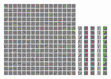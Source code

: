 \begin{figure}[t]
    \centering
        \newcommand{\codeheight}{0.25}
        \includegraphics[height=\codeheight\linewidth]{figs/sizematters/centroids/dictionary_ap.png}\qquad\qquad
        \includegraphics[height=\codeheight\textwidth]{figs/sizematters/centroids/1-neighbors.png}
        \includegraphics[height=\codeheight\textwidth]{figs/sizematters/centroids/2-neighbors.png}
        \includegraphics[height=\codeheight\textwidth]{figs/sizematters/centroids/6-neighbors.png}
        \includegraphics[height=\codeheight\textwidth]{figs/sizematters/centroids/89-neighbors.png}
        \includegraphics[height=\codeheight\textwidth]{figs/sizematters/centroids/42-neighbors.png}

\end{figure}

